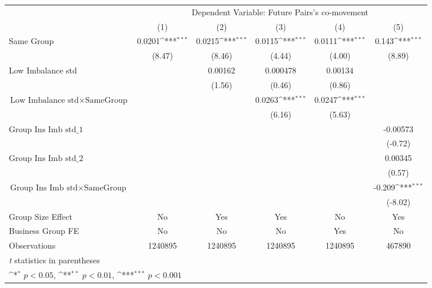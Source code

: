 {
\def\sym#1{\ifmmode^{#1}\else\(^{#1}\)\fi}
\begin{tabular}{l*{5}{c}}
\hline\hline
                &\multicolumn{5}{c}{Dependent Variable:  Future Pairs's co-movement}                           \\\cmidrule(lr){2-6}
                &\multicolumn{1}{c}{(1)}         &\multicolumn{1}{c}{(2)}         &\multicolumn{1}{c}{(3)}         &\multicolumn{1}{c}{(4)}         &\multicolumn{1}{c}{(5)}         \\
\hline
Same Group      &   0.0201\sym{***}&   0.0215\sym{***}&   0.0115\sym{***}&   0.0111\sym{***}&    0.143\sym{***}\\
                &   (8.47)         &   (8.46)         &   (4.44)         &   (4.00)         &   (8.89)         \\
[1em]
Low Imbalance std&                  &  0.00162         & 0.000478         &  0.00134         &                  \\
                &                  &   (1.56)         &   (0.46)         &   (0.86)         &                  \\
[1em]
 $ \text{Low Imbalance std} \times {\text{SameGroup} } $ &                  &                  &   0.0263\sym{***}&   0.0247\sym{***}&                  \\
                &                  &                  &   (6.16)         &   (5.63)         &                  \\
[1em]
 $ {\text{Group Ins Imb std}\_1} $ &                  &                  &                  &                  & -0.00573         \\
                &                  &                  &                  &                  &  (-0.72)         \\
[1em]
 $ {\text{Group Ins Imb std}\_2} $ &                  &                  &                  &                  &  0.00345         \\
                &                  &                  &                  &                  &   (0.57)         \\
[1em]
$ {\text{Group Ins Imb std} } \times {\text{SameGroup} }  $ &                  &                  &                  &                  &   -0.209\sym{***}\\
                &                  &                  &                  &                  &  (-8.02)         \\
\hline
Group Size Effect&       No         &      Yes         &      Yes         &       No         &      Yes         \\
Business Group FE&       No         &       No         &       No         &      Yes         &       No         \\
Observations    &  1240895         &  1240895         &  1240895         &  1240895         &   467890         \\
\hline\hline
\multicolumn{6}{l}{\footnotesize \textit{t} statistics in parentheses}\\
\multicolumn{6}{l}{\footnotesize \sym{*} \(p<0.05\), \sym{**} \(p<0.01\), \sym{***} \(p<0.001\)}\\
\end{tabular}
}
